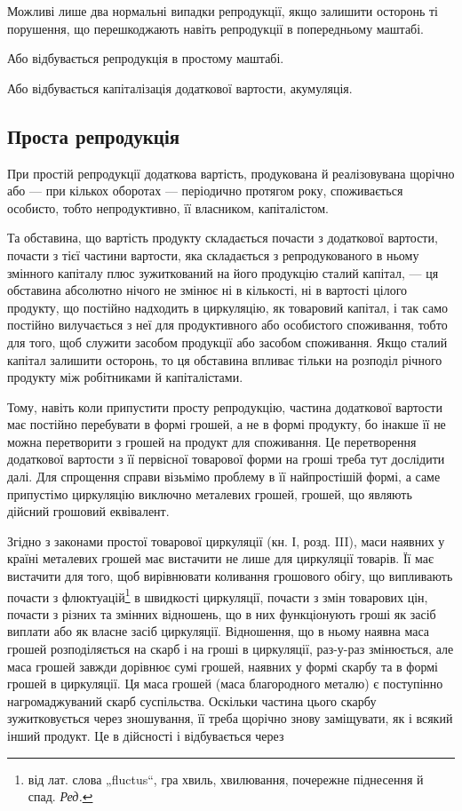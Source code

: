 
Можливі лише два нормальні випадки репродукції, якщо залишити
осторонь ті порушення, що перешкоджають навіть репродукції в попередньому
маштабі.

Або відбувається репродукція в простому маштабі.

Або відбувається капіталізація додаткової вартости, акумуляція.

\subsection{Проста репродукція}

При простій репродукції додаткова вартість, продукована й реалізовувана
щорічно або — при кількох оборотах — періодично протягом року,
споживається особисто, тобто непродуктивно, її власником, капіталістом.

Та обставина, що вартість продукту складається почасти з додаткової
вартости, почасти з тієї частини вартости, яка складається з репродукованого
в ньому змінного капіталу плюс зужиткований на його продукцію
сталий капітал, — ця обставина абсолютно нічого не змінює ні в кількості,
ні в вартості цілого продукту, що постійно надходить в циркуляцію, як
товаровий капітал, і так само постійно вилучається з неї для продуктивного
або особистого споживання, тобто для того, щоб служити засобом
продукції або засобом споживання. Якщо сталий капітал залишити осторонь,
то ця обставина впливає тільки на розподіл річного продукту між
робітниками й капіталістами.

Тому, навіть коли припустити просту репродукцію, частина додаткової
вартости має постійно перебувати в формі грошей, а не в формі
продукту, бо інакше її не можна перетворити з грошей на продукт для
споживання. Це перетворення додаткової вартости з її первісної товарової
форми на гроші треба тут дослідити далі. Для спрощення справи
візьмімо проблему в її найпростішій формі, а саме припустімо циркуляцію
виключно металевих грошей, грошей, що являють дійсний грошовий еквівалент.

Згідно з законами простої товарової циркуляції (кн. І, розд. III), маси
наявних у країні металевих грошей має вистачити не лише для
циркуляції товарів. Її має вистачити для того, щоб вирівнювати коливання
грошового обігу, що випливають почасти з флюктуацій\footnote*{
від лат. слова „fluctus“, гра хвиль, хвилювання, почережне
піднесення й спад. \emph{Ред.}
} в швидкості
циркуляції, почасти з змін товарових цін, почасти з різних та
змінних відношень, що в них функціонують гроші як засіб виплати або
як власне засіб циркуляції. Відношення, що в ньому наявна маса грошей
розподіляється на скарб і на гроші в циркуляції, раз-у-раз змінюється, але
маса грошей завжди дорівнює сумі грошей, наявних у формі скарбу та
в формі грошей в циркуляції. Ця маса грошей (маса благородного металю)
є поступінно нагромаджуваний скарб суспільства. Оскільки частина цього
скарбу зужитковується через зношування, її треба щорічно знову заміщувати,
як і всякий інший продукт. Це в дійсності і відбувається через
\parbreak{}  %
